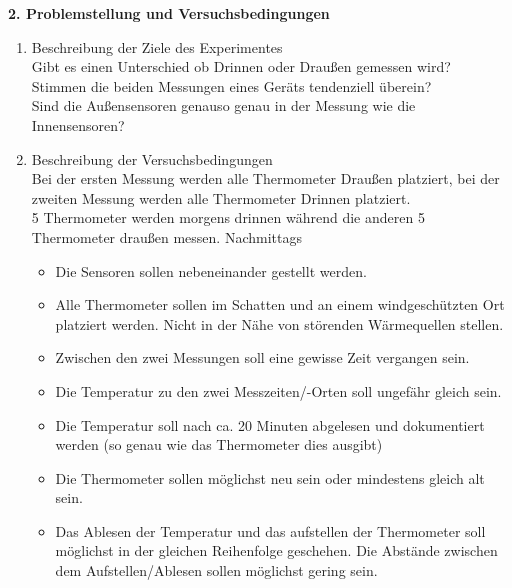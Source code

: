 \documentclass[ ngerman, fontsize= 12pt, paper=a4, headings=big, titlepage=true]{article}
\begin{document}
\textbf{2. Problemstellung und Versuchsbedingungen}
\begin{enumerate}[-]
\item Beschreibung der Ziele des Experimentes \\
	Gibt es einen Unterschied ob Drinnen oder Draußen gemessen wird?\\
	Stimmen die beiden Messungen eines Geräts tendenziell überein?\\
	Sind die Außensensoren genauso genau in der Messung wie die Innensensoren?\\ 
	
\item Beschreibung der Versuchsbedingungen\\
Bei der ersten Messung werden alle Thermometer Draußen platziert, bei der zweiten Messung werden alle Thermometer Drinnen platziert.\\

5 Thermometer werden morgens drinnen  während die anderen 5 Thermometer draußen messen. Nachmittags 
\begin{itemize}
	
\item Die Sensoren sollen nebeneinander gestellt werden.\\

\item Alle Thermometer sollen im Schatten und an einem windgeschützten Ort platziert werden. Nicht in der Nähe von störenden Wärmequellen stellen. \\

\item Zwischen den zwei Messungen soll eine gewisse Zeit vergangen sein.

\item Die Temperatur zu den zwei Messzeiten/-Orten soll ungefähr gleich sein.

\item Die Temperatur soll nach ca. 20 Minuten abgelesen und dokumentiert werden (so genau wie das Thermometer dies ausgibt) \\

\item Die Thermometer sollen möglichst neu sein oder mindestens gleich alt sein.\\

\item Das Ablesen der Temperatur und das aufstellen der Thermometer soll möglichst in der gleichen Reihenfolge geschehen. Die Abstände zwischen dem Aufstellen/Ablesen sollen möglichst gering sein.

\end{itemize}


\end{enumerate}
\end{document}
